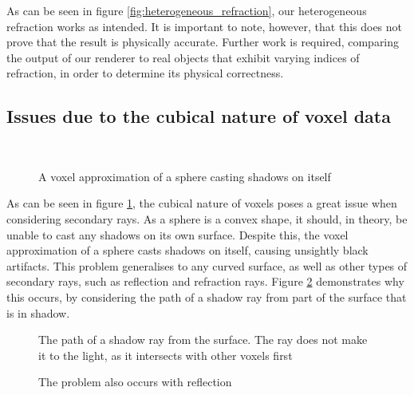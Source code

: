 As can be seen in figure \ref{fig:heterogeneous_refraction}, our heterogeneous refraction works as intended. It is important to note, however, that this does not prove that the result is physically accurate. Further work is required, comparing the output of our renderer to real objects that exhibit varying indices of refraction, in order to determine its physical correctness.

\subsection{Issues due to the cubical nature of voxel data}

\begin{figure}
	\centering
	~

	\caption{A voxel approximation of a sphere casting shadows on itself}
	\label{fig:shadow-problem}
\end{figure}

As can be seen in figure \ref{fig:shadow-problem}, the cubical nature of voxels poses a great issue when considering secondary rays. As a sphere is a convex shape, it should, in theory, be unable to cast any shadows on its own surface. Despite this, the voxel approximation of a sphere casts shadows on itself, causing unsightly black artifacts. This problem generalises to any curved surface, as well as other types of secondary rays, such as reflection and refraction rays. Figure \ref{fig:shadow-problem-ray-path} demonstrates why this occurs, by considering the path of a shadow ray from part of the surface that is in shadow.

\begin{figure}
	\centering

	\caption{The path of a shadow ray from the surface. The ray does not make it to the light, as it intersects with other voxels first}
	\label{fig:shadow-problem-ray-path}
\end{figure}

\begin{figure}
	\centering

	\caption{The problem also occurs with reflection}
	\label{fig:shadow-problem-reflection}
\end{figure}

